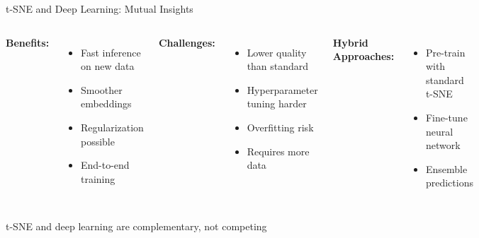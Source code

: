 \documentclass[aspectratio=169]{beamer}
\begin{document}
\begin{frame}{t-SNE and Deep Learning: Mutual Insights}
\begin{columns}
  \textbf{Benefits:}
\begin{itemize}
\item Fast inference on new data
\item Smoother embeddings
\item Regularization possible
\item End-to-end training
\end{itemize}

\textbf{Challenges:}
\begin{itemize}
\item Lower quality than standard
\item Hyperparameter tuning harder
\item Overfitting risk
\item Requires more data
\end{itemize}

\textbf{Hybrid Approaches:}
\begin{itemize}
\item Pre-train with standard t-SNE
\item Fine-tune neural network
\item Ensemble predictions
\end{itemize}
\end{columns}

\vspace{0.3cm}
\colorbox{green!20}{\parbox{0.95\textwidth}{\centering t-SNE and deep learning are complementary, not competing}}
\end{frame}
\end{document}
